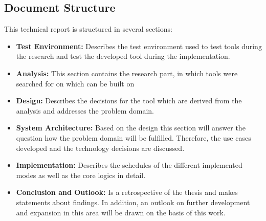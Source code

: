 \subsection{Document Structure}
This technical report is structured in several sections:
\begin{itemize}
    \item \textbf{Test Environment:} Describes the test environment used to test tools during the research and test the developed tool during the implementation.
    \item \textbf{Analysis:} This section contains the research part, in which tools were searched for on which can be built on
    \item \textbf{Design:} Describes the decisions for the tool which are derived from the analysis and addresses the problem domain.
    \item \textbf{System Architecture:} Based on the design this section will answer the question how the problem domain will be fulfilled. Therefore, the use cases developed and the technology decisions are discussed.
    \item \textbf{Implementation:} Describes the schedules of the different implemented modes as well as the core logics in detail.
    \item \textbf{Conclusion and Outlook:} Is a retrospective of the thesis and makes statements about findings. In addition, an outlook on further development and expansion in this area will be drawn on the basis of this work.
\end{itemize}